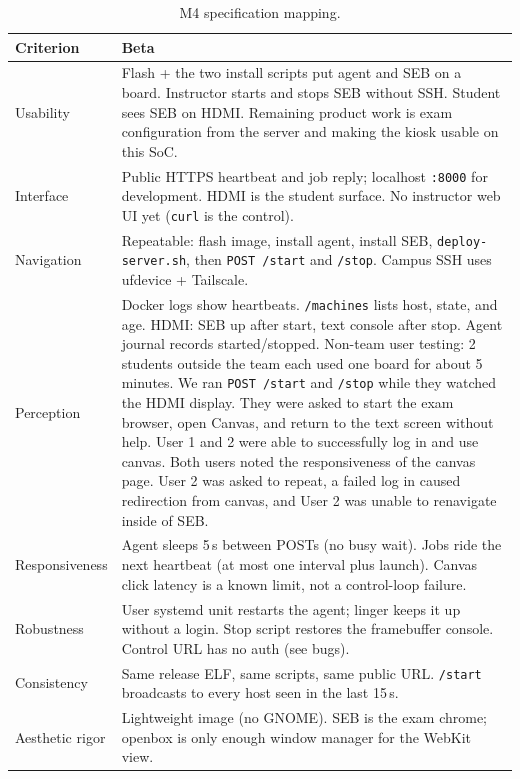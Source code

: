 \documentclass[11pt]{article}
\begin{document}
\begin{table}[H]
  \centering
  \small
  \setlength{\tabcolsep}{6pt}
  \begin{tabularx}{\textwidth}{@{}l >{\raggedright\arraybackslash}X@{}}
    \toprule
    \textbf{Criterion} & \textbf{Beta} \\
    \midrule
    Usability &
    Flash + the two install scripts put agent and SEB on a board. Instructor starts and stops SEB without SSH. Student sees SEB on HDMI. Remaining product work is exam configuration from the server and making the kiosk usable on this SoC. \\
    Interface &
    Public HTTPS heartbeat and job reply; localhost \texttt{:8000} for development. HDMI is the student surface. No instructor web UI yet (\texttt{curl} is the control). \\
    Navigation &
    Repeatable: flash image, install agent, install SEB, \texttt{deploy-server.sh}, then \texttt{POST /start} and \texttt{/stop}. Campus SSH uses ufdevice + Tailscale. \\
    Perception &
    Docker logs show heartbeats. \texttt{/machines} lists host, state, and age. HDMI: SEB up after start, text console after stop. Agent journal records started/stopped.
    Non-team user testing: 2 students outside the team each used one board for about 5 minutes. We ran \texttt{POST /start} and \texttt{/stop} while they watched the HDMI display. They were asked to start the exam browser, open Canvas, and return to the text screen without help. User 1 and 2 were able to successfully log in and use canvas. Both users noted the responsiveness of the canvas page. User 2 was asked to repeat, a failed log in caused redirection from canvas, and User 2 was unable to renavigate inside of SEB. \\
    Responsiveness &
    Agent sleeps 5\,s between POSTs (no busy wait). Jobs ride the next heartbeat (at most one interval plus launch). Canvas click latency is a known limit, not a control-loop failure. \\
    Robustness &
    User systemd unit restarts the agent; linger keeps it up without a login. Stop script restores the framebuffer console. Control URL has no auth (see bugs). \\
    Consistency &
    Same release ELF, same scripts, same public URL. \texttt{/start} broadcasts to every host seen in the last 15\,s. \\
    Aesthetic rigor &
    Lightweight image (no GNOME). SEB is the exam chrome; openbox is only enough window manager for the WebKit view. \\
    \bottomrule
  \end{tabularx}
  \caption{M4 specification mapping.}
  \label{tab:rubric}
\end{table}
\end{document}
